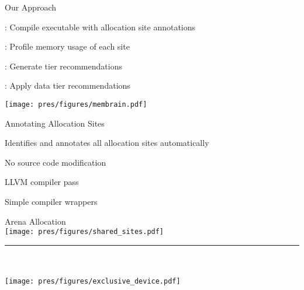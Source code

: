 \documentclass[final,hyperref={pdfpagelabels=false}]{beamer}
\begin{document}
\begin{frame}{Our Approach}
  \begin{customlist}{0em}{0em}
    \item {}: Compile executable with allocation site annotations
    \item {}: Profile memory usage of each site
    \item {}: Generate tier recommendations
    \item {}: Apply data tier recommendations
  \end{customlist}
  \vspace{2em}
  \centering
  \texttt{[image: pres/figures/membrain.pdf]}
\end{frame}

\lstset{showspaces=false,showstringspaces=false}%
\begin{frame}{Annotating Allocation Sites}
  \begin{customlist}{0em}{0em}
    \item Identifies and annotates all allocation sites automatically
    \item No source code modification
    \item LLVM compiler pass
    \item Simple compiler wrappers
  \end{customlist}
  \centering
  \vspace{2em}
\end{frame}

\begin{frame}{Arena Allocation}
  \centering
  \\
  \texttt{[image: pres/figures/shared\_sites.pdf]}
  \vspace{1em}
  \noindent\rule{10cm}{0.4pt}
  \vspace{1em}\\
  \\
  \texttt{[image: pres/figures/exclusive\_device.pdf]}
\end{frame}
\end{document}
